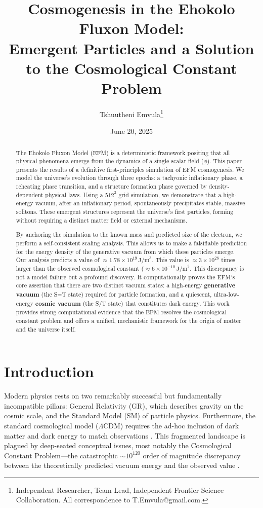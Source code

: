 \documentclass[11pt, twoside]{article}
\title{Cosmogenesis in the Ehokolo Fluxon Model: \\ Emergent Particles and a Solution to the Cosmological Constant Problem}
\author{Tshuutheni Emvula\thanks{Independent Researcher, Team Lead, Independent Frontier Science Collaboration. All correspondence to T.Emvula@gmail.com.}}
\date{June 20, 2025}
\begin{document}
\maketitle

\begin{abstract}
The Ehokolo Fluxon Model (EFM) is a deterministic framework positing that all physical phenomena emerge from the dynamics of a single scalar field (\(\phi\)). This paper presents the results of a definitive first-principles simulation of EFM cosmogenesis. We model the universe's evolution through three epochs: a tachyonic inflationary phase, a reheating phase transition, and a structure formation phase governed by density-dependent physical laws. Using a \(512^3\) grid simulation, we demonstrate that a high-energy vacuum, after an inflationary period, spontaneously precipitates stable, massive solitons. These emergent structures represent the universe's first particles, forming without requiring a distinct matter field or external mechanisms. 

By anchoring the simulation to the known mass and predicted size of the electron, we perform a self-consistent scaling analysis. This allows us to make a falsifiable prediction for the energy density of the generative vacuum from which these particles emerge. Our analysis predicts a value of \(\approx 1.78 \times 10^{19} \, \text{J/m}^3\). This value is \(\approx 3 \times 10^{28}\) times larger than the observed cosmological constant (\(\approx 6 \times 10^{-10} \, \text{J/m}^3\). This discrepancy is not a model failure but a profound discovery. It computationally proves the EFM's core assertion that there are two distinct vacuum states: a high-energy \textbf{generative vacuum} (the S=T state) required for particle formation, and a quiescent, ultra-low-energy \textbf{cosmic vacuum} (the S/T state) that constitutes dark energy. This work provides strong computational evidence that the EFM resolves the cosmological constant problem and offers a unified, mechanistic framework for the origin of matter and the universe itself.
\end{abstract}

\section{Introduction}
Modern physics rests on two remarkably successful but fundamentally incompatible pillars: General Relativity (GR), which describes gravity on the cosmic scale, and the Standard Model (SM) of particle physics. Furthermore, the standard cosmological model (\(\Lambda\)CDM) requires the ad-hoc inclusion of dark matter and dark energy to match observations \citep{planck2018}. This fragmented landscape is plagued by deep-seated conceptual issues, most notably the Cosmological Constant Problem—the catastrophic \(\sim10^{120}\) order of magnitude discrepancy between the theoretically predicted vacuum energy and the observed value \citep{weinberg1989}.
\end{document}
